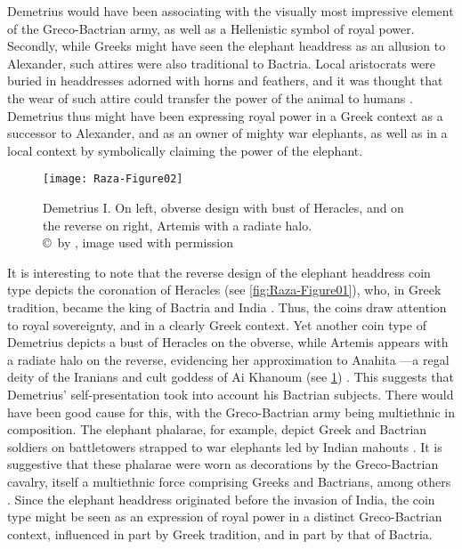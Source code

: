 \documentclass{ijsra}
\begin{document}
Demetrius would have been associating with the visually most impressive element of the Greco-Bactrian army,
as well as a Hellenistic symbol of royal power.
Secondly, while Greeks might have seen the elephant headdress as an allusion to Alexander, such attires were also traditional to Bactria.
Local aristocrats were buried in headdresses adorned with horns and feathers,
and it was thought that the wear of such attire could transfer the power of the animal to humans \parencite[215--226]{Lerner2009}.
Demetrius thus might have been expressing royal power in a Greek context as a successor to Alexander,
and as an owner of mighty war elephants, as well as in a local context by symbolically claiming the power of the elephant.

\begin{figure}[!htb] %
	\centering
	\texttt{[image: Raza-Figure02]}
	\caption{Demetrius I. On left, obverse design with bust of Heracles, and on the reverse on right, Artemis with a radiate halo. 
		{\normalfont\scriptsize \\ \copyright\ by \citeauthor{Coin}, image used with permission}}
	\label{fig:Raza-Figure02}
\end{figure}

It is interesting to note that the reverse design of the elephant headdress coin type depicts the coronation of Heracles (see \cref{fig:Raza-Figure01}),
who, in Greek tradition, became the king of Bactria and India \parencites[70--80]{Bukharin2004}[140]{Stanco2012}. %
Thus, the coins draw attention to royal sovereignty, and in a clearly Greek context.
Yet another coin type of Demetrius depicts a bust of Heracles on the obverse, while Artemis appears with a radiate halo on the reverse,
evidencing her approximation to Anahita —a regal deity of the Iranians and cult goddess of Ai Khanoum (see \cref{fig:Raza-Figure02})
\parencite[242]{MacDowall2007b}.
This suggests that Demetrius’ self-presentation took into account his Bactrian subjects.
There would have been good cause for this, with the Greco-Bactrian army being multiethnic in composition.
The elephant phalarae, for example, depict Greek and Bactrian soldiers on battletowers strapped to war elephants led by Indian mahouts
\parencites[10]{Pfrommer1993}[588]{Treister1999}.
It is suggestive that these phalarae were worn as decorations by the Greco-Bactrian cavalry, itself a multiethnic force comprising
Greeks and Bactrians, among others \parencite[50--51]{Lerner1999}.
Since the elephant headdress originated before the invasion of India, the coin type might be seen as an expression of royal power
in a distinct Greco-Bactrian context, influenced in part by Greek tradition, and in part by that of Bactria.
\end{document}
